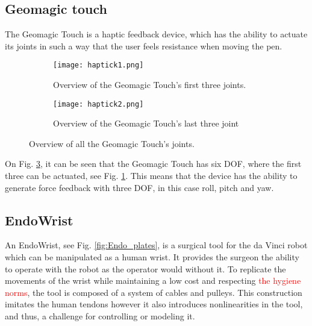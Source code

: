 
\subsection{Geomagic touch}\label{sec:Geomagic_touch}
The Geomagic Touch is a haptic feedback device, which has the ability to actuate its joints in such a way that the user feels resistance when moving the pen. 


\begin{figure}[h]
  \centering
  \begin{subfigure}{.22\textwidth}
    \centering
    \texttt{[image: haptick1.png]}
    \caption{Overview of the Geomagic Touch's first three joints.}
    \label{fig:phantom1}
  \end{subfigure}
  \begin{subfigure}{.22\textwidth}
    \centering
    \texttt{[image: haptick2.png]}
    \caption{Overview of the Geomagic Touch's last three joint}
    \label{fig:phantom2}
  \end{subfigure}
\caption{Overview of all the Geomagic Touch's joints.}
\label{fig:phantom_omni}
\end{figure}


On Fig. \ref{fig:phantom_omni}, it can be seen that the Geomagic Touch has six DOF, where the first three can be actuated, see Fig. \ref{fig:phantom1}. This means that the device has the ability to generate force feedback with three DOF, in this case roll, pitch and yaw.



    
\subsection{EndoWrist}\label{sec:EndoWrist}

An EndoWrist, see Fig. \ref{fig:Endo_plates}, is a surgical tool for the da Vinci robot which can be manipulated as a human wrist. It provides the surgeon the ability to operate with the robot as the operator would without it. To replicate the movements of the wrist while maintaining a low cost and respecting \textcolor{red}{the hygiene norms}, the tool is composed of a system of cables and pulleys. This construction imitates the human tendons however it also introduces nonlinearities in the tool, and thus, a challenge for controlling or modeling it.

